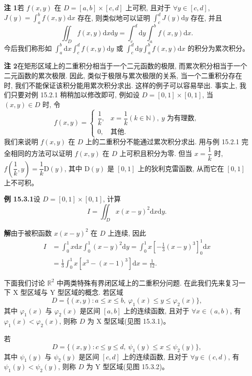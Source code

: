 \documentclass[UTF8, 12pt, fontset=fandol, oneside]{ctexart}
\begin{document}
\noindent\textbf{注 1}\quad 若 $f(x,y)$ 在 $D=[a,b]\times[c,d]$ 上可积, 且对于 $\forall y\in[c,d]$, $J(y)=\int_a^b f(x,y)\mathrm dx$ 存在, 则类似地可以证明 $\int_c^d J(y)\mathrm dy$ 存在, 并且
\[
  \iint_D f(x,y)\mathrm dx\mathrm dy
  =
  \int_c^d\mathrm dy\int_a^b f(x,y)\mathrm dx.
\]
今后我们称形如 $\int_a^b\mathrm dx\int_c^d f(x,y)\mathrm dy$ 或 $\int_c^d\mathrm dy\int_a^b f(x,y)\mathrm dx$ 的积分为累次积分。

\noindent\textbf{注 2}\quad 在矩形区域上的二重积分相当于一个二元函数的极限, 而累次积分相当于一个二元函数的累次极限. 因此, 类似于极限与累次极限的关系, 当一个二重积分存在时, 我们不能保证该积分能用累次积分求出. 这样的例子可以容易举出. 事实上, 我们只要对例 15.2.1 稍稍加以修改即可, 例如设 $D=[0,1]\times[0,1]$, 当 $(x,y)\in D$ 时, 令
\[
  f(x,y)=
  \begin{cases}
    \dfrac1k, & x=\dfrac1k(k\in\mathbb N),\ y\text{ 为有理数},\\
    0, & \text{其他}.
  \end{cases}
\]
我们来说明 $f(x,y)$ 在 $D$ 上的二重积分不能通过累次积分求出. 用与例 15.2.1 完全相同的方法可以证明 $f(x,y)$ 在 $D$ 上可积且积分为零. 但当 $x=\dfrac1k$ 时, $f\left(\dfrac1k,y\right)=\dfrac1k\mathrm D(y)$, 其中 $\mathrm D(y)$ 是 $[0,1]$ 上的狄利克雷函数, 从而它在 $[0,1]$ 上不可积。

\noindent\textbf{例 15.3.1}\quad 设 $D=[0,1]\times[0,1]$, 计算
\[
  I=\iint_D x(x-y)^2\mathrm dx\mathrm dy.
\]

\noindent\textbf{解}\quad 由于被积函数 $x(x-y)^2$ 在 $D$ 上连续, 因此
\[
\begin{aligned}
  I
  &=\int_0^1 x\mathrm dx\int_0^1(x-y)^2\mathrm dy
    =\int_0^1 x\left[-\frac13(x-y)^3\right]_0^1\mathrm dx\\
  &=\frac13\int_0^1x[x^3-(x-1)^3]\mathrm dx
    =\frac1{12}.
\end{aligned}
\]

下面我们讨论 $\mathbb R^2$ 中两类特殊有界闭区域上的二重积分问题. 在此我们先来复习一下 X 型区域与 Y 型区域的概念. 若区域
\[
  D=\{(x,y):a\leqslant x\leqslant b,\ \varphi_1(x)\leqslant y\leqslant\varphi_2(x)\},
\]
其中 $\varphi_1(x)$ 与 $\varphi_2(x)$ 是区间 $[a,b]$ 上的连续函数, 且对于 $\forall x\in(a,b)$, 有 $\varphi_1(x)<\varphi_2(x)$, 则称 $D$ 为 X 型区域(见图 15.3.1)。

若
\[
  D=\{(x,y):c\leqslant y\leqslant d,\ \psi_1(y)\leqslant x\leqslant\psi_2(y)\},
\]
其中 $\psi_1(y)$ 与 $\psi_2(y)$ 是区间 $[c,d]$ 上的连续函数, 且对于 $\forall y\in(c,d)$, 有 $\psi_1(y)<\psi_2(y)$, 则称 $D$ 为 Y 型区域(见图 15.3.2)。
\end{document}
